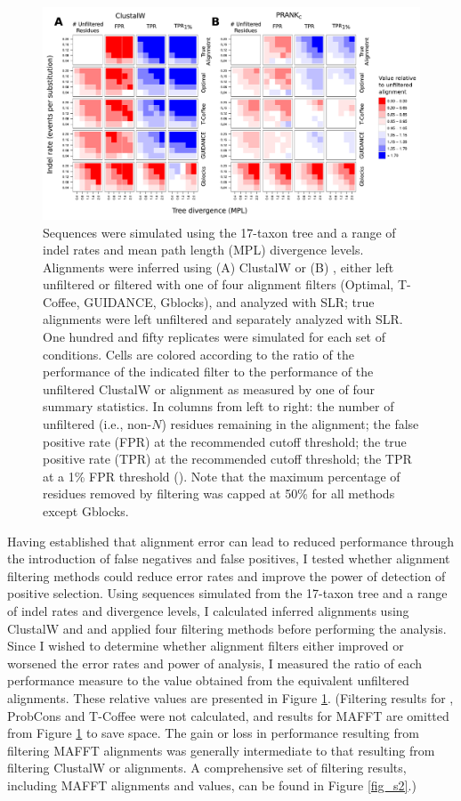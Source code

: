 \begin{figure}[t!]
\centering
\includegraphics[scale=0.65]{Figs/fig5.pdf}
\caption{Sequences were simulated using the 17-taxon tree and a range
  of indel rates and mean path length (MPL) divergence
  levels. Alignments were inferred using (A) ClustalW or (B) \prankc,
  either left unfiltered or filtered with one of four alignment
  filters (Optimal, T-Coffee, GUIDANCE, Gblocks), and analyzed with
  SLR; true alignments were left unfiltered and separately analyzed
  with SLR. One hundred and fifty replicates were simulated for each
  set of conditions. Cells are colored according to the ratio of the
  performance of the indicated filter to the performance of the
  unfiltered ClustalW or \prankc alignment as measured by one of four
  summary statistics. In columns from left to right: the number of
  unfiltered (i.e., non-$N$) residues remaining in the alignment; the
  false positive rate (FPR) at the recommended cutoff threshold; the
  true positive rate (TPR) at the recommended cutoff threshold; the
  TPR at a 1\% FPR threshold (\tpr). Note that the maximum percentage
  of residues removed by filtering was capped at 50\% for all methods
  except Gblocks.}
\label{fig_5}
\end{figure}

Having established that alignment error can lead to reduced \sw
performance through the introduction of false negatives and false
positives, I tested whether alignment filtering methods could reduce
error rates and improve the power of \sw detection of positive
selection. Using sequences simulated from the 17-taxon tree and a
range of indel rates and divergence levels, I calculated inferred
alignments using ClustalW and \prankc and applied four filtering
methods before performing the \sw analysis. Since I wished to
determine whether alignment filters either improved or worsened the
error rates and power of \sw analysis, I measured the ratio of each
performance measure to the value obtained from the equivalent
unfiltered alignments. These relative values are presented in Figure
\ref{fig_5}. (Filtering results for \pranka, ProbCons and
  T-Coffee were not calculated, and results for MAFFT are omitted from
  Figure \ref{fig_5} to save space. The gain or loss in performance
  resulting from filtering MAFFT alignments was generally intermediate
  to that resulting from filtering ClustalW or \prankc alignments. A
  comprehensive set of filtering results, including MAFFT alignments
  and \tprf values, can be found in Figure \ref{fig_s2}.)

